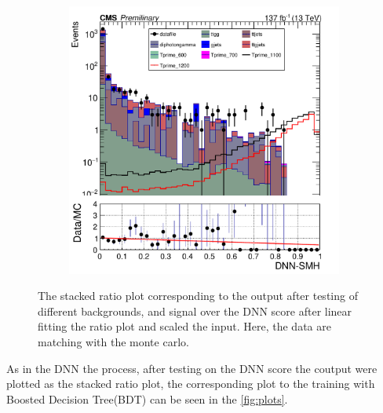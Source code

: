 \begin{figure}[H]
\begin{subfigure}[b]{0.3\textwidth}
         \label{fig:three sin x}
     \end{subfigure}
    \hfill
     \begin{subfigure}[b]{0.3\textwidth}
         \centering
         \includegraphics[width=\textwidth]{figure_4/Stacked_plot_DNN_1100-1200_with_diphoton_cuts_scaled_inputs.pdf}
         \label{fig:three sin x}
     \end{subfigure}
          \caption{The stacked ratio plot corresponding to the output after testing of different backgrounds, and signal over the DNN score after linear fitting the ratio plot and scaled the input. Here, the data are matching with the monte carlo.}
          \label{fig:stacked_scaled_plots_DNN_200}
\end{figure}



As in the DNN the process, after testing on the DNN score the coutput were plotted as the stacked 
ratio plot, the corresponding plot to the training with Boosted Decision Tree(BDT) can be seen in the
\autoref{fig:plots}. 


